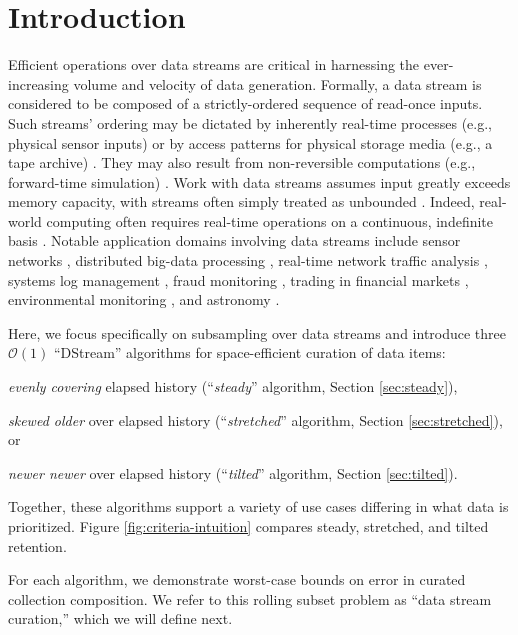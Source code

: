\section{Introduction} \label{sec:introduction}

Efficient operations over data streams are critical in harnessing the ever-increasing volume and velocity of data generation.
Formally, a data stream is considered to be composed of a strictly-ordered sequence of read-once inputs.
Such streams' ordering may be dictated by inherently real-time processes (e.g., physical sensor inputs) or by access patterns for physical storage media (e.g., a tape archive) \citep{henzinger1998computing}.
They may also result from non-reversible computations (e.g., forward-time simulation) \citep{abdulla2004simulation,schutzel2014stream}.
Work with data streams assumes input greatly exceeds memory capacity, with streams often simply treated as unbounded \citep{jiang2006research}.
Indeed, real-world computing often requires real-time operations on a continuous, indefinite basis \citep{cordeiro2016online}.
Notable application domains involving data streams include sensor networks \citep{elnahrawy2003research}, distributed big-data processing \citep{he2010comet}, real-time network traffic analysis \citep{johnson2005streams,muthukrishnan2005data}, systems log management \citep{fischer2012real}, fraud monitoring \citep{rajeshwari2016real}, trading in financial markets \citep{agarwal2009faster}, environmental monitoring \citep{hill2009real}, and astronomy \citep{graham2012data}.

Here, we focus specifically on subsampling over data streams and introduce three $\mathcal{O}(1)$ ``DStream'' algorithms for space-efficient curation of data items:
\begin{enumerate*}
\item \textit{evenly covering} elapsed history (``\textit{steady}'' algorithm, Section \ref{sec:steady}),
\item \textit{skewed older} over elapsed history (``\textit{stretched}'' algorithm, Section \ref{sec:stretched}), or
\item \textit{newer newer} over elapsed history (``\textit{tilted}'' algorithm, Section \ref{sec:tilted}).
\end{enumerate*}
Together, these algorithms support a variety of use cases differing in what data is prioritized.
Figure \ref{fig:criteria-intuition} compares steady, stretched, and tilted retention.

For each algorithm, we demonstrate worst-case bounds on error in curated collection composition.
We refer to this rolling subset problem as ``data stream curation,'' which we will define next.






